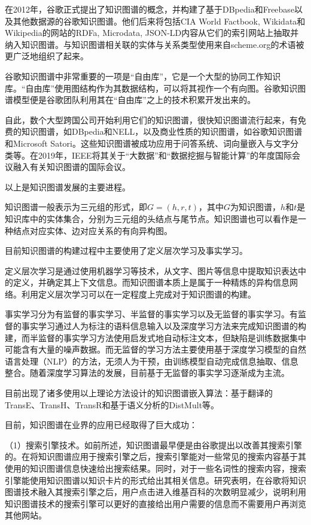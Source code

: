 \documentclass{bjfuthesis}
\begin{document}
在2012年，谷歌正式提出了知识图谱的概念\cite{singhal2012introducing}，并构建了基于DBpedia和Freebase以及其他数据源的谷歌知识图谱。他们后来将包括CIA World Factbook, Wikidata和Wikipedia的网站的RDFa, Microdata, JSON-LD内容从它们的索引网站上抽取并纳入知识图谱。与知识图谱相关联的实体与关系类型使用来自scheme.org的术语被更广泛地组织了起来。

谷歌知识图谱中非常重要的一项是“自由库”，它是一个大型的协同工作知识库。“自由库”使用图结构作为其数据结构，可以将其视作一个有向图。谷歌知识图谱模型便是谷歌团队利用其在“自由库”之上的技术积累开发出来的\cite{漆桂林2017知识图谱研究进展}。

自此，数个大型跨国公司开始利用它们的知识图谱，很快知识图谱流行起来，有免费的知识图谱，如DBpedia和NELL，以及商业性质的知识图谱，如谷歌知识图谱和Microsoft Satori。这些知识图谱被成功应用于问答系统、词向量嵌入与文字分类等。在2019年，IEEE将其关于“大数据”和“数据挖掘与智能计算”的年度国际会议融入有关知识图谱的国际会议。

以上是知识图谱发展的主要进程。

知识图谱一般表示为三元组的形式，即$G=(h,r,t)$，其中$G$为知识图谱，$h$和$t$是知识库中的实体集合，分别为三元组的头结点与尾节点\cite{徐增林2016知识图谱技术综述}。知识图谱也可以看作是一种结点对应实体、边对应关系的有向异构图。

目前知识图谱的构建过程中主要使用了定义层次学习及事实学习。

定义层次学习是通过使用机器学习等技术，从文字、图片等信息中提取知识表达中的定义，并确定其上下文信息。而知识图谱本质上是属于一种精炼的异构信息网络。利用定义层次学习可以在一定程度上完成对于知识图谱的构建。

事实学习分为有监督的事实学习、半监督的事实学习以及无监督的事实学习。有监督的事实学习通过人为标注的语料信息输入以及深度学习方法来完成知识图谱的构建，而半监督的事实学习方法使用启发式地自动标注文本，但缺陷是训练数据集中可能含有大量的噪声数据。而无监督的学习方法主要使用基于深度学习模型的自然语言处理（NLP）的方法，无须人为干预，由训练模型自动完成信息抽取、信息整合。随着深度学习算法的发展，目前基于无监督的事实学习逐渐成为主流\cite{李涓子2017知识图谱研究综述}。

目前出现了诸多使用以上理论方法设计的知识图谱嵌入算法：基于翻译的TransE\cite{bordes2013translating}、TransH\cite{wang2014knowledge}、TransR\cite{lin2017learning}和基于语义分析的DistMult\cite{yang2014embedding}等。

目前，知识图谱在业界的应用已经取得了巨大成功\cite{曹倩2015知识图谱的技术实现流程及相关应用}：

（1）搜索引擎技术。如前所述，知识图谱最早便是由谷歌提出以改善其搜索引擎的。在将知识图谱应用于搜索引擎之后，搜索引擎能对一些常见的搜索内容基于其使用的知识图谱信息快速给出搜索结果。同时，对于一些名词性的搜索内容，搜索引擎能使用知识图谱以知识卡片的形式给出其相关信息。研究表明，在谷歌将知识图谱技术融入其搜索引擎之后，用户点击进入维基百科的次数明显减少，说明利用知识图谱技术的搜索引擎可以更好的直接给出用户需要的信息而不需要用户再浏览其他网站。
\end{document}
